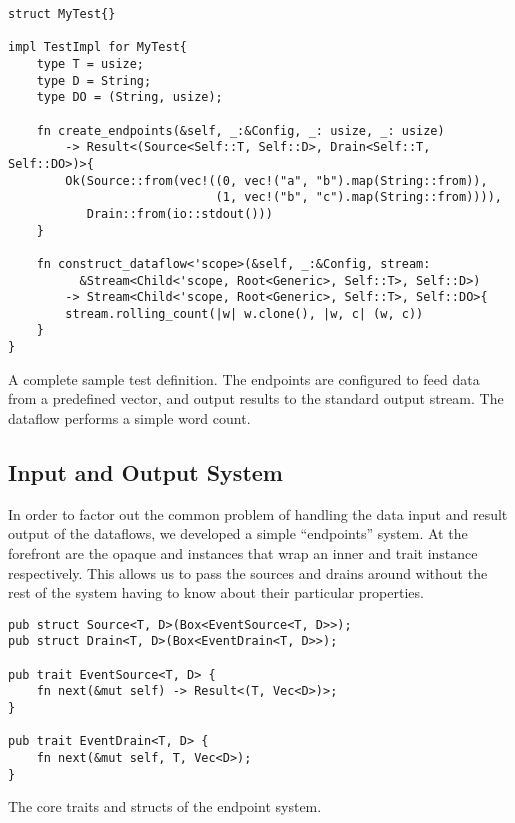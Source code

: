 \begin{listing}[H]
\begin{verbatim}
struct MyTest{}

impl TestImpl for MyTest{
    type T = usize;
    type D = String;
    type DO = (String, usize);

    fn create_endpoints(&self, _:&Config, _: usize, _: usize)
        -> Result<(Source<Self::T, Self::D>, Drain<Self::T, Self::DO>)>{
        Ok(Source::from(vec!((0, vec!("a", "b").map(String::from)),
                             (1, vec!("b", "c").map(String::from)))),
           Drain::from(io::stdout()))
    }
    
    fn construct_dataflow<'scope>(&self, _:&Config, stream: 
          &Stream<Child<'scope, Root<Generic>, Self::T>, Self::D>)
        -> Stream<Child<'scope, Root<Generic>, Self::T>, Self::DO>{
        stream.rolling_count(|w| w.clone(), |w, c| (w, c))
    }
}
\end{verbatim}
  \caption{A complete sample test definition. The endpoints are configured to feed data from a predefined vector, and output results to the standard output stream. The dataflow performs a simple word count.}
  \label{lst:create-test}
\end{listing}

\subsection{Input and Output System}
In order to factor out the common problem of handling the data input and result output of the dataflows, we developed a simple ``endpoints'' system. At the forefront are the opaque  and  instances that wrap an inner  and  trait instance respectively. This allows us to pass the sources and drains around without the rest of the system having to know about their particular properties. \\

\begin{listing}[H]
\begin{verbatim}
pub struct Source<T, D>(Box<EventSource<T, D>>);
pub struct Drain<T, D>(Box<EventDrain<T, D>>);

pub trait EventSource<T, D> {
    fn next(&mut self) -> Result<(T, Vec<D>)>;
}

pub trait EventDrain<T, D> {
    fn next(&mut self, T, Vec<D>);
}
\end{verbatim}
  \caption{The core traits and structs of the endpoint system.}
  \label{lst:endpoints}
\end{listing}

